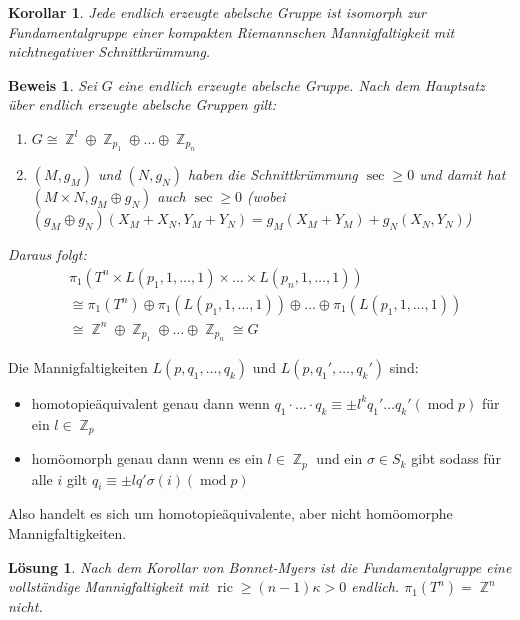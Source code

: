 \documentclass[paper=A4, twoside, chapterprefix=true, bibliography=totoc, headsepline]{scrbook}
\DeclareMathOperator{\Z}{\mathbb{Z}}
\DeclareMathOperator{\mmod}{mod}    %
\DeclareMathOperator{\ric}{ric}     %
\newcommand{\X}{\times}
\theoremstyle{plain}
\theoremstyle{nonumberplain}
\newtheorem{kor}{Korollar}
\newtheorem{bew}{Beweis}
\theoremstyle{empty}
\theoremstyle{break}
\newtheorem{Loes}{L\"osung}
\begin{document}
\begin{kor}
Jede endlich erzeugte abelsche Gruppe ist isomorph zur Fundamentalgruppe einer kompakten Riemannschen Mannigfaltigkeit mit nichtnegativer Schnittkr\"ummung.
\end{kor}

\begin{bew}
Sei $G$ eine endlich erzeugte abelsche Gruppe.
Nach dem Hauptsatz \"uber endlich erzeugte abelsche Gruppen gilt:
\begin{enumerate}[label=(\arabic*)]
\item
	$G \cong \Z^l \oplus \Z_{p_1} \oplus \ldots \oplus \Z_{p_n}$
\item
	$(M, g_M)$ und $(N, g_N)$ haben die Schnittkr\"ummung $\sec \ge 0$ und damit hat $(M \X N, g_M \oplus g_N)$ auch $\sec \ge 0$ (wobei $(g_M \oplus g_N)(X_M + X_N, Y_M + Y_N) = g_M(X_M + Y_M) + g_N(X_N, Y_N)$)
\end{enumerate}
Daraus folgt:
\begin{align*}
	&\pi_1(T^n \X L(p_1, 1, \ldots ,1) \X \ldots \X L(p_n, 1, \ldots , 1)) \\
	&\cong \pi_1(T^n) \oplus \pi_1(L(p_1, 1, \ldots ,1)) \oplus \ldots \oplus \pi_1(L(p_1, 1, \ldots ,1)) \\
	&\cong \Z^n \oplus \Z_{p_1} \oplus \ldots \oplus \Z_{p_n} \cong G
\end{align*}
\end{bew}

Die Mannigfaltigkeiten $L(p, q_1, \ldots ,q_k)$ und $L(p, q_1', \ldots ,q_k')$ sind:\begin{itemize}
\item
	homotopie\"aquivalent genau dann wenn $q_1 \cdot \ldots \cdot q_k \equiv \pm l^k q_1' \ldots q_k' (\mmod p)$ f\"ur ein $l \in \Z_p$ \cite{olum}
\item
	hom\"oomorph genau dann wenn es ein $l \in \Z_p$ und ein $\sigma \in S_k$ gibt sodass f\"ur alle $i$ gilt $q_i \equiv \pm l q' \sigma(i) (\mmod p)$ \cite{brody1960}
\end{itemize}
Also handelt es sich um homotopie\"aquivalente, aber nicht hom\"oomorphe Mannigfaltigkeiten.

\begin{Loes}
Nach dem Korollar von Bonnet-Myers ist die Fundamentalgruppe eine vollst\"andige Mannigfaltigkeit mit $\ric \ge (n-1) \kappa > 0$ endlich.
$\pi_1(T^n) = \Z^n$ nicht.
\end{Loes}
\end{document}
